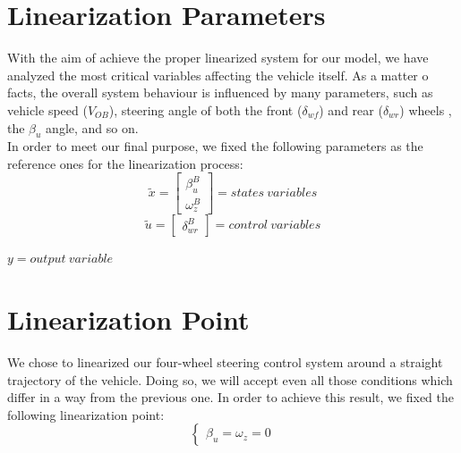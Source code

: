 \documentclass[a4paper,12pt,titlepage]{report}
\begin{document}
\section{Linearization Parameters} 
	With the aim of achieve the proper linearized system for our model, we have analyzed the most critical variables affecting the vehicle itself. As a matter o facts, the overall system behaviour is influenced by many parameters, such as vehicle speed ($V_{OB}$), steering angle of both the front ($\delta_{wf}$) and rear ($\delta_{wr}$) wheels , the $\beta_{u}$ angle, and so on. \\
	In order to meet our final purpose, we fixed the following parameters as the reference ones for the linearization process:\\
		\begin{equation*}
			\tilde{x} =
			\begin{bmatrix}
			\beta_{u}^{B} \\\omega_{z}^{B}
			\end{bmatrix} = states \ variables
		\end{equation*}\quad
		\begin{equation*} 
			\tilde{u} =
			\begin{bmatrix}
			\delta_{wr}^{B} 
			\end{bmatrix} = control \ variables
		\end{equation*}\quad
		\begin{center}
			$ y = output \ variable $	
		\end{center}

\section{Linearization Point} 
	We chose to linearized our four-wheel steering control system around a straight trajectory of the vehicle. Doing so, we will accept even all those conditions which differ in a way from the previous one. In order to achieve this result, we fixed the following linearization point:
		\begin{equation*}
			\begin{cases}
				\beta_{u} = \omega_{z} = 0
			\end{cases}
		\end{equation*}
\end{document}
